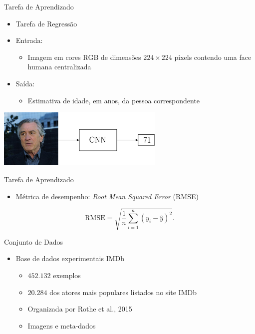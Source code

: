 \begin{frame}{Tarefa de Aprendizado}
\begin{itemize}
  \item \alert{Tarefa de Regressão}
  \item \alert{Entrada}:
  \begin{itemize}
    \item Imagem em cores RGB de dimensões $224 \times 224$ pixels contendo uma face humana centralizada
  \end{itemize}
   \item \alert{Saída}:
   \begin{itemize}
        \item Estimativa de idade, em anos, da pessoa correspondente
   \end{itemize}
\end{itemize}
\begin{center}
     \includegraphics[width=0.60\textwidth]{img/deniro_cnn}
\end{center}
\end{frame}


\begin{frame}{Tarefa de Aprendizado}
     \begin{itemize}
          \item Métrica de desempenho: \emph{Root Mean Squared Error} (RMSE)
     \end{itemize}
     \begin{equation}\label{eq:rmse}
          \textrm{RMSE} = \sqrt{\frac{1}{n} \sum_{i=1}^n (y_i - \hat{y})^2}.
     \end{equation}
  \end{frame}

\begin{frame}{Conjunto de Dados}
  \begin{itemize}
    \item Base de dados experimentais IMDb
    \begin{itemize}
      \item $452.132$ exemplos
      \item $20.284$ dos atores mais populares listados no site IMDb
      \item Organizada por Rothe et al., 2015
      \item Imagens e meta-dados
    \end{itemize}
  \end{itemize}
\end{frame}

